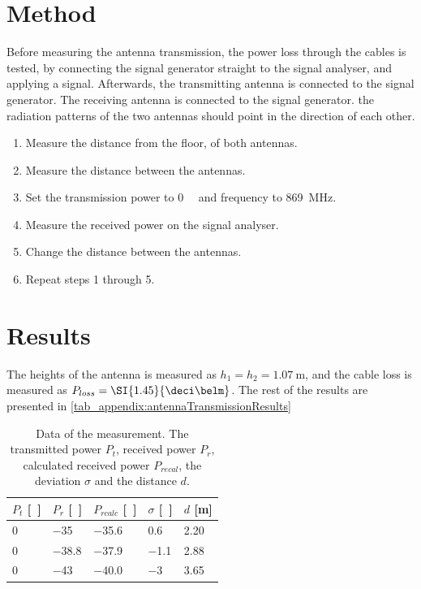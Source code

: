 \section*{Method}
Before measuring the antenna transmission, the power loss through the cables is tested, by connecting the signal generator straight to the signal analyser, and applying a signal.
Afterwards, the transmitting antenna is connected to the signal generator. The receiving antenna is connected to the signal generator. the radiation patterns of the two antennas should point in the direction of each other. 
\begin{enumerate}
\item Measure the distance from the floor, of both antennas.
\item Measure the distance between the antennas.
\item Set the transmission power to \SI{0}{\deci\belm} and frequency to \SI{869}{\mega\hertz}.
\item Measure the received power on the signal analyser.
\item Change the distance between the antennas.
\item Repeat steps 1 through 5.
\end{enumerate}

\section*{Results}
The heights of the antenna is measured as $h_1 = h_2 = \SI{1.07}{\meter}$, and the cable loss is measured as $P_{loss}=\SI{1.45}{\deci\belm}$. The rest of the results are presented in \autoref{tab_appendix:antennaTransmissionResults}
\begin{table}[!h]
	\centering
	\caption{Data of the measurement. The transmitted power $P_t$, received power $P_r$, calculated received power $P_{recal}$, the deviation $\sigma$ and the distance $d$.}\label{tab_appendix:antennaTransmissionResults}
	
\begin{tabularx}{\textwidth}{XXXXX}
	 $P_t$ [\si{\deci\belm}]& $P_r$ [\si{\deci\belm}]&$ P_{rcalc}$ [\si{\deci\belm}]& $\sigma$ [\si{\deci\belm}] & $d$ [\si{\meter}]							\\ \toprule \rowcolor{lightGrey}
		0 & \SI{-35}{}& \SI{-35.6}{}& \SI{0.6}{} &\SI{2.20}{}	\\
		0	& \SI{-38.8}{}&\SI{-37.9}{} & \SI{-1.1}{} &\SI{2.88}{}\\ \rowcolor{lightGrey}
		0 & \SI{-43}{}&\SI{-40.0}{} & \SI{-3}{} &\SI{3.65}{} 
	\end{tabularx}
\end{table}

